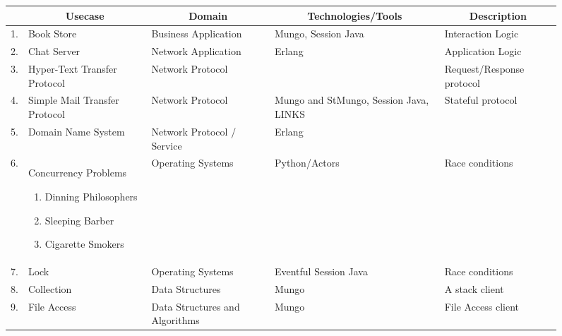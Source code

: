 \begin{figure}
	\begin{longtable}{| c | p{3.2cm} | p{3cm} | p{2.5cm} | p{2.7cm} | }
		\hline
			&	\multicolumn{1}{c|}{Usecase}
							&	\multicolumn{1}{c|}{Domain}
														&	\multicolumn{1}{c|}{Technologies/Tools}
																					&	\multicolumn{1}{c|}{Description}
		\\
		\hline
		1.	&	Book Store	&	Business Application	&	Mungo, Session Java		&	Interaction Logic
		\\

		\hline
		2.	&	Chat Server	&	Network Application		&	Erlang					&	Application Logic
		\\

		\hline
		3.	&	Hyper-Text Transfer Protocol
							&	Network Protocol		&							&	Request/Response protocol
		\\

		\hline
		4.	&	Simple Mail Transfer Protocol
							&	Network Protocol		&	Mungo and StMungo, Session Java, LINKS
																					&	Stateful protocol
		\\
		\hline
		5.	&	Domain Name System
							&	Network Protocol / Service		&	Erlang
																					&	
		\\
		\hline
		6.	&	Concurrency	Problems
				\begin{enumerate}[label=$\bullet$]
					\item	Dinning Philosophers
					\item	Sleeping Barber
					\item	Cigarette Smokers
				\end{enumerate}
							&	Operating Systems		&	Python/Actors			&	Race conditions
		\\
		\hline
		7.	&	Lock		&	Operating Systems		&	Eventful Session Java	&	Race conditions
		\\

		\hline
		8.	&	Collection	&	Data Structures			&	Mungo					&	A stack client
		\\

		\hline
		9.	&	File Access	&	Data Structures and Algorithms
														&	Mungo					&	File Access client
		\\


\end{longtable}
\end{figure}
